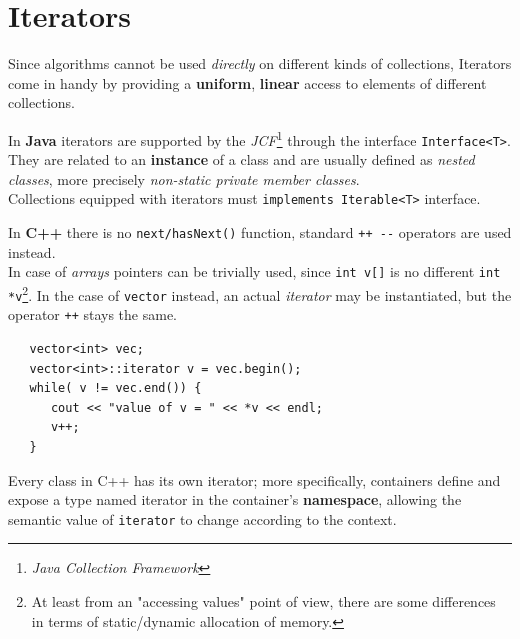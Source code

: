 \section{Iterators}
Since algorithms cannot be used \textit{directly} on different kinds of collections,
Iterators come in handy by providing a \textbf{uniform}, \textbf{linear} access to elements of different collections.

In \textbf{Java} iterators are supported by the \textit{JCF}\footnote{\textit{Java Collection Framework}} through the interface \lstinline|Interface<T>|.
They are related to an \textbf{instance} of a class and are usually defined as \textit{nested classes},
more precisely \textit{non-static private member classes}.\\
Collections equipped with iterators must \lstinline|implements Iterable<T>| interface.
\nl


In \textbf{C++} there is no \lstinline|next/hasNext()| function, standard \lstinline|++ --| operators are used instead.\\
\lstset{language=C++}
In case of \textit{arrays} pointers can be trivially used,
since \lstinline|int v[]| is no different \lstinline|int *v|\footnote{At least from an "accessing values" point of view, there are some differences in terms of static/dynamic allocation of memory.}.
In the case of \lstinline|vector| instead, an actual \textit{iterator} may be instantiated,
but the operator \lstinline|++| stays the same.
\begin{lstlisting}
   vector<int> vec;
   vector<int>::iterator v = vec.begin();
   while( v != vec.end()) {
      cout << "value of v = " << *v << endl;
      v++;
   }
\end{lstlisting}

Every class in C++ has its own iterator;
more specifically, containers define and expose a type named iterator in the container's \textbf{namespace},
allowing the semantic value of \lstinline|iterator| to change according to the context.

